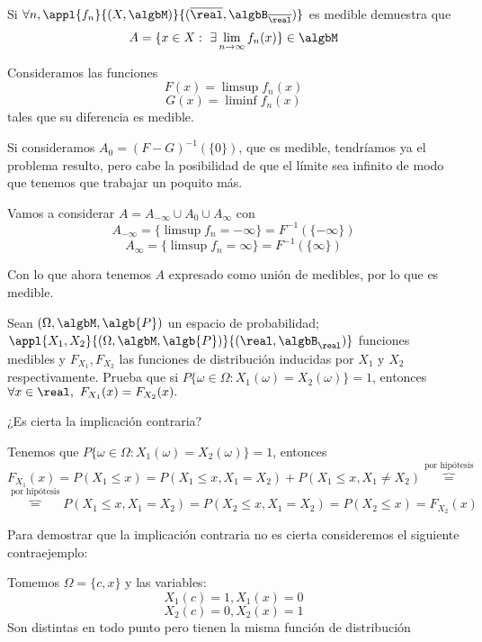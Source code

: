 \begin{problem}[5]
Si $\forall n, \appl{f_n}{(X,\algbM)}{(\overline{\real}, \algbB_{\overline{\real}})}$ es medible demuestra que
\[A = \{x \in X : \ \exists  \lim_{n \to \infty} f_n(x)\} \in \algbM\]
\solution

Consideramos las funciones
\[F(x) = \limsup f_n(x) \]
\[G(x) = \liminf f_n(x) \]
tales que su diferencia es medible.

Si consideramos $A_0=(F-G)^{-1}(\{0\})$, que es medible, tendríamos ya el problema resulto, pero cabe la posibilidad de que el límite sea infinito de modo que tenemos que trabajar un poquito más.

Vamos a considerar $A=A_{-\infty} \cup A_0 \cup A_{\infty}$ con
\[A_{-\infty} = \{\limsup f_n = -\infty\}=F^{-1}(\{-\infty\})\]
\[A_{\infty} = \{\limsup f_n = \infty\}=F^{-1}(\{\infty\})\]

Con lo que ahora tenemos $A$ expresado como unión de medibles, por lo que es medible.

\end{problem}

\begin{problem}[6]
Sean $(\Omega, \algbM, \algb{P})$ un espacio de probabilidad; $\appl{X_1, X_2}{(\Omega, \algbM, \algb{P})}{(\real, \algbB_{\real})}$ funciones medibles y $F_{X_1}, F_{X_2}$ las funciones de distribución inducidas por $X_1$ y $X_2$ respectivamente. Prueba que si $P\{\omega \in \Omega : X_1(\omega)=X_2(\omega)\}=1$, entonces $\forall x \in \real, \ F_{X_1}(x) = F_{X_2}(x).$

¿Es cierta la implicación contraria?

\solution
Tenemos que $P\{\omega \in \Omega : X_1(\omega)=X_2(\omega)\}=1$, entonces
\[F_{X_1}(x) = P(X_1 \leq x) = P(X_1 \leq x, X_1=X_2) + P(X_1 \leq x, X_1 \neq X_2) \overbrace{=}^{\text{por hipótesis}}  \]
\[\overbrace{=}^{\text{por hipótesis}}  P(X_1 \leq x, X_1=X_2) = P(X_2 \leq x, X_1=X_2)=P(X_2  \leq x)=F_{X_2}(x)\]

Para demostrar que la implicación contraria no es cierta consideremos el siguiente contraejemplo:

Tomemos $\Omega = \{c,x\}$ y las variables:
\[X_1(c)=1, X_1(x)=0\]
\[X_2(c)=0, X_2(x)=1\]
Son distintas en todo punto pero tienen la misma función de distribución
\end{problem}


